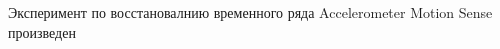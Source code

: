 \documentclass[12pt, twoside]{article}
\begin{document}
 
Эксперимент по восстановалнию временного ряда Accelerometer Motion Sense произведен 
\begin{comment}

Шаг 1: мы решаем задачу оптимизации каждого слоя с помощью ковариационных матриц.

Шаг 2: (для оптимизации)в течение процедуры оптимизации используем  такую функцию ошибки, которая вклячает часть, называющуюся дистилляцией.

Есть 2 модели.
1 сложная - HTNet, 
2 простая - наша - байесовская модель.

Что мы делаем:

2 раза пишем формулу Байеса. Считаем правдоподобие сложной модели, постериор сложной модели по весам - это prior по весам простой модели.

Мы его фиксируем согласно статьям Грабового (2 последние статьи), [диссертация Грабового]

И оптимизируем posterior простой модели с помощью простого механизма. [читать статью про "Функция ошибки в задачах линейной регрессии"].

ЧТОБЫ СДЕЛАТЬ маленькую модель, нужно анализировать ков матрицы! маленькой модели.
Когда настраиваем маленькую модель мы одновременно настраиваем веса (матож) и (cov). А то, как мы выбираем структуру модели - с помощью анализа cov матриц - (последний пункт нашей постановки) - метод Белсли (Бахтеев + Грабовой - мпнс "метод белсли в выборе нейросетей"). Берем принцыпы Белсли + Байес = статья! 

Мы фиксируем структуру хорошей переобученной модели. 

<--- Это все диссер Грабового (о том, как апостериорное распределение модели учителя преобразовать в априорное на модели ученика с другой арзитектурой.


\end{comment}



\end{document}

